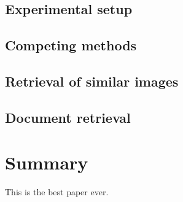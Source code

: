 \documentclass{article}
\begin{document}
\subsection{Experimental setup}
\subsection{Competing methods}
\subsection{Retrieval of similar images}
\subsection{Document retrieval}


\section{Summary}
This is the best paper ever.






\end{document}
